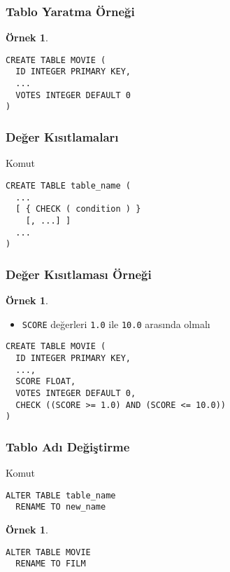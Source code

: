 \documentclass[dvipsnames]{beamer}
\theoremstyle{definition}
\theoremstyle{example}
\newtheorem{ornek}[theorem]{Örnek}
\theoremstyle{plain}
\begin{document}
\begin{frame}[fragile]
  \frametitle{Tablo Yaratma Örneği}

  \begin{ornek}
    \begin{lstlisting}
CREATE TABLE MOVIE (
  ID INTEGER PRIMARY KEY,
  ...
  VOTES INTEGER DEFAULT 0
)
    \end{lstlisting}
  \end{ornek}
\end{frame}

\begin{frame}[fragile]
  \frametitle{Değer Kısıtlamaları}

  \begin{block}{Komut}
    \begin{lstlisting}
CREATE TABLE table_name (
  ...
  [ { CHECK ( condition ) }
    [, ...] ]
  ...
)
    \end{lstlisting}
  \end{block}
\end{frame}

\begin{frame}[fragile]
  \frametitle{Değer Kısıtlaması Örneği}

  \begin{ornek}
    \begin{itemize}
      \item \texttt{SCORE} değerleri \texttt{1.0} ile \texttt{10.0} arasında
        olmalı
    \end{itemize}

    \begin{lstlisting}
CREATE TABLE MOVIE (
  ID INTEGER PRIMARY KEY,
  ...,
  SCORE FLOAT,
  VOTES INTEGER DEFAULT 0,
  CHECK ((SCORE >= 1.0) AND (SCORE <= 10.0))
)
    \end{lstlisting}
  \end{ornek}
\end{frame}

\begin{frame}[fragile]
  \frametitle{Tablo Adı Değiştirme}

  \begin{block}{Komut}
    \begin{lstlisting}
ALTER TABLE table_name
  RENAME TO new_name
    \end{lstlisting}
  \end{block}

  \pause
  \medskip
  \begin{ornek}
    \begin{lstlisting}
ALTER TABLE MOVIE
  RENAME TO FILM
    \end{lstlisting}
  \end{ornek}
\end{frame}
\end{document}
